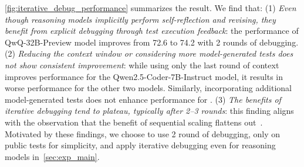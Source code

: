 \cref{fig:iterative_debug_performance} summarizes the result. We find that: (1) \textit{Even though reasoning models implicitly perform self-reflection and revising, they benefit from explicit debugging through test execution feedback}: the performance of QwQ-32B-Preview model improves from 72.6 to 74.2 with 2 rounds of debugging. 
(2) \textit{Reducing the context window or considering more model-generated tests does not show consistent improvement}: while using only the last round of context improves performance for the Qwen2.5-Coder-7B-Instruct model, it results in worse performance for the other two models. Similarly, incorporating additional model-generated tests does not enhance performance for \fouromini.
(3) \textit{The benefits of iterative debugging tend to plateau, typically after 2–3 rounds}: this finding aligns with the observation that the benefit of sequential scaling flattens out~\citep{muennighoff2025s1}. Motivated by these findings, we choose to use 2 round of debugging, only on public tests for simplicity, and apply iterative debugging even for reasoning models in~\cref{sec:exp_main}.





